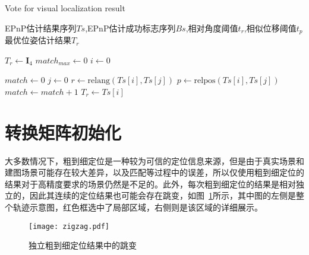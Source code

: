 \renewcommand{\algorithmicrequire}{\textbf{输入：}\unskip}
\renewcommand{\algorithmicensure}{\textbf{输出：}\unskip}
\begin{algorithm}
  \caption{Vote for visual localization result}
  \label{alg2}
  \small
  \begin{algorithmic}[1]
    \REQUIRE EPnP估计结果序列$Ts$,EPnP估计成功标志序列$Bs$,相对角度阈值$t_r$,相似位移阈值$t_p$
    \ENSURE 最优位姿估计结果$T_{r}$

    \STATE $T_{r} \leftarrow \symbf{I}_4$
    \STATE ${match}_{max} \leftarrow 0$
    \STATE $i \leftarrow 0$

      \STATE $match \leftarrow 0$
        \STATE $j \leftarrow 0$
          \STATE $r \leftarrow \text{relang}(Ts[i], Ts[j])$
          \STATE $p \leftarrow \text{relpos}(Ts[i], Ts[j])$
            \STATE $match \leftarrow match + 1$
          \ENDIF
        \ENDWHILE
          \STATE $T_{r} \leftarrow Ts[i]$
        \ENDIF
      \ENDIF
    \ENDWHILE
  \end{algorithmic}
\end{algorithm}

\section{转换矩阵初始化}

大多数情况下，粗到细定位是一种较为可信的定位信息来源，但是由于真实场景和建图场景可能存在较大差异，以及匹配等过程中的误差，所以仅使用粗到细定位的结果对于高精度要求的场景仍然是不足的。此外，每次粗到细定位的结果是相对独立的，因此其连续的定位结果也可能会存在跳变，如图~\ref{fig:zigzag}所示，其中图的左侧是整个轨迹示意图，红色框选中了局部区域，右侧则是该区域的详细展示。

\begin{figure}
  \centering
  \texttt{[image: zigzag.pdf]}
  \caption{独立粗到细定位结果中的跳变}
  \label{fig:zigzag}
\end{figure}

